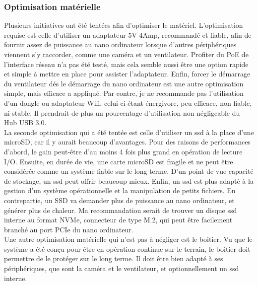\subsubsection{Optimisation matérielle}
\noindent Plusieurs initiatives ont été tentées afin d'optimiser le matériel. L'optimisation requise est celle d'utiliser un adaptateur 5V 4Amp, recommandé et fiable, afin de fournir assez de puissance au nano ordinateur lorsque d'autres périphériques viennent s'y raccorder, comme une caméra et un ventilateur. Profiter du PoE de l'interface réseau n'a pas été testé, mais cela semble aussi être une option rapide et simple à mettre en place pour assister l'adaptateur. Enfin, forcer le démarrage du ventilateur dés le démarrage du nano ordinateur est une autre optimisation simple, mais efficace a appliqué. Par contre, je ne recommande pas l'utilisation d'un dongle ou adaptateur Wifi, celui-ci étant énergivore, peu efficace, non fiable, ni stable. Il prendrait de plus un pourcentage d'utilisation non négligeable du Hub USB 3.0. 
\vspace{\baselineskip}
\\
\noindent La seconde optimisation qui a été tentée est celle d'utiliser un \acrshort{ssd} à la place d'une microSD, car il y aurait beaucoup d'avantages. Pour des raisons de performances d'abord, le gain peut-être d'au moins 4 fois plus grand en opération de lecture I/O. Ensuite, en durée de vie, une carte microSD est fragile et ne peut être considérée comme un système fiable sur le long terme. D'un point de vue capacité de stockage, un \acrshort{ssd} peut offrir beaucoup mieux. Enfin, un \acrshort{ssd} est plus adapté à la gestion d'un système opérationnelle et la manipulation de petits fichiers. En contrepartie, un SSD va demander plus de puissance au nano ordinateur, et générer plus de chaleur. Ma recommandation serait de trouver un disque \acrshort{ssd} interne au format NVMe, connecteur de type M.2, qui peut être facilement branché au port PCIe du nano ordinateur.
\vspace{\baselineskip}
\\
\noindent Une autre optimisation matérielle qui n'est pas à négliger est le boitier. Vu que le système a été conçu pour être en opération continue sur le terrain, le boitier doit permettre de le protéger sur le long terme. Il doit être bien adapté à ses périphériques, que sont la caméra et le ventilateur, et optionnellement un \acrshort{ssd} interne.
